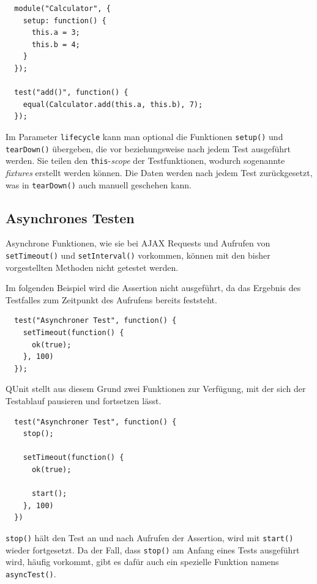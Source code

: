 \documentclass[11pt, a4paper]{article}
\begin{document}
\begin{verbatim}
  module("Calculator", {
    setup: function() {
      this.a = 3;
      this.b = 4;
    }
  });

  test("add()", function() {
    equal(Calculator.add(this.a, this.b), 7);
  });
\end{verbatim}

Im Parameter \texttt{lifecycle} kann man optional die Funktionen
\texttt{setup()} und \texttt{tearDown()} übergeben, die vor beziehungsweise nach
jedem Test ausgeführt werden. Sie teilen den \texttt{this}-\emph{scope} der
Testfunktionen, wodurch sogenannte \emph{fixtures} erstellt werden können. Die
Daten werden nach jedem Test zurückgesetzt, was in \texttt{tearDown()} auch
manuell geschehen kann.

\subsection{Asynchrones Testen}

Asynchrone Funktionen, wie sie bei AJAX Requests und Aufrufen von
\texttt{setTimeout()} und \texttt{setInterval()} vorkommen, können mit den
bisher vorgestellten Methoden nicht getestet werden.

Im folgenden Beispiel\cite{huang_how_2010} wird die Assertion nicht ausgeführt, da das
Ergebnis des Testfalles zum Zeitpunkt des Aufrufens bereits feststeht.

\begin{verbatim}
  test("Asynchroner Test", function() {
    setTimeout(function() {
      ok(true);
    }, 100)
  });
\end{verbatim}

QUnit stellt aus diesem Grund zwei Funktionen zur Verfügung, mit der
sich der Testablauf pausieren und fortsetzen lässt.

\begin{verbatim}
  test("Asynchroner Test", function() {
    stop();

    setTimeout(function() {
      ok(true);

      start();
    }, 100)
  })
\end{verbatim}

\texttt{stop()} hält den Test an und nach Aufrufen der Assertion, wird
mit \texttt{start()} wieder fortgesetzt. Da der Fall, dass \texttt{stop()} am
Anfang eines Tests ausgeführt wird, häufig vorkommt, gibt es dafür auch ein
spezielle Funktion namens \texttt{asyncTest()}.
\end{document}
